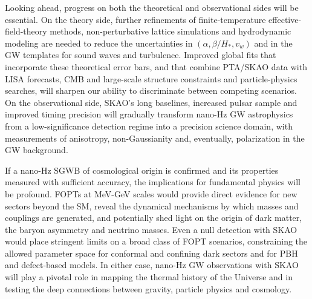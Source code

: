 \documentclass[a4paper,11pt]{article}
\begin{document}
Looking ahead, progress on both the theoretical and observational sides will be essential. On the theory side, further
refinements of finite-temperature effective-field-theory methods, non-perturbative lattice simulations and hydrodynamic
modeling are needed to reduce the uncertainties in $(\alpha,\beta/H_*,v_w)$ and in the GW templates for sound waves and
turbulence. Improved global fits that incorporate these theoretical error bars, and that combine PTA/SKAO data with LISA
forecasts, CMB and large-scale structure constraints and particle-physics searches, will sharpen our ability to discriminate
between competing scenarios. On the observational side, SKAO’s long baselines, increased pulsar sample and improved timing
precision will gradually transform nano-Hz GW astrophysics from a low-significance detection regime into a precision science
domain, with measurements of anisotropy, non-Gaussianity and, eventually, polarization in the GW background.

If a nano-Hz SGWB of cosmological origin is confirmed and its properties measured with sufficient accuracy, the implications 
for fundamental physics will be profound. FOPTs at MeV-GeV scales would provide direct evidence for
new sectors beyond the SM, reveal the dynamical mechanisms by which masses and couplings are generated, and potentially shed
light on the origin of dark matter, the baryon asymmetry and neutrino masses. Even a null detection with SKAO would place
stringent limits on a broad class of FOPT scenarios, constraining the allowed parameter space for conformal and confining 
dark sectors and for PBH and defect-based models. In either case, nano-Hz GW observations with SKAO will play a pivotal role 
in mapping the thermal history of the Universe and in testing the deep connections between gravity, particle physics and
cosmology.






\end{document}
